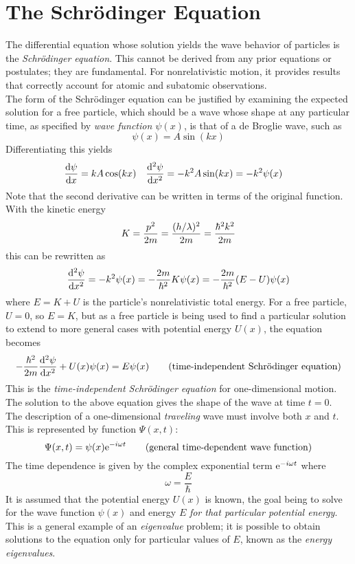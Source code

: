 \documentclass{subfiles}
\begin{document}
	\section{The Schr\"odinger Equation}
		The differential equation whose solution yields the wave behavior of particles is the \textit{Schr\"odinger equation}. This cannot be derived from any prior equations or postulates; they are fundamental. For nonrelativistic motion, it provides results that correctly account for atomic and subatomic observations. \\
		The form of the Schr\"odinger equation can be justified by examining the expected solution for a free particle, which should be a wave whose shape at any particular time, as specified by \textit{wave function \(\psi(x)\)}, is that of a de Broglie wave, such as
			\[\psi(x) = A\sin(kx)\]
			Differentiating this yields
			\begin{align*}
				\dv{\psi}{x} &= kA\cos(kx) &
					\dv[2]{\psi}{x} &= -k^2A\sin(kx)
						= -k^2\psi(x)
			\end{align*}
			Note that the second derivative can be written in terms of the original function. With the kinetic energy
			\[
				K = \frac{p^2}{2m} \\
					= \frac{(h/\lambda)^2}{2m}
					= \frac{\hbar^2k^2}{2m}	
			\]
			this can be rewritten as
			\[
				\dv[2]{\psi}{x}
					= -k^2\psi(x)
					= -\frac{2m}{\hbar^2}K\psi(x)
					= -\frac{2m}{\hbar^2}(E - U)\psi(x)
			\]
			where \(E = K + U\) is the particle's nonrelativistic total energy. For a free particle, \(U = 0\), so \(E = K\), but as a free particle is being used to find a particular solution to extend to more general cases with potential energy \(U(x)\), the equation becomes
			\[-\frac{\hbar^2}{2m}\dv[2]{\psi}{x} + U(x)\psi(x) = E\psi(x) \tag{time-independent Schr\"odinger equation}\]
			This is the \textit{time-independent Schr\"odinger equation} for one-dimensional motion. \\
		The solution to the above equation gives the shape of the wave at time \(t = 0\). The description of a one-dimensional \textit{traveling} wave must involve both \(x\) and \(t\). This is represented by function \(\Psi(x, t)\):
			\[\Psi(x, t) = \psi(x)\text{e}^{-i\omega t} \tag{general time-dependent wave function}\]
			The time dependence is given by the complex exponential term \(\text{e}^{-i\omega t}\) where
			\[\omega = \frac{E}{\hbar}\]
		It is assumed that the potential energy \(U(x)\) is known, the goal being to solve for the wave function \(\psi(x)\) and energy \(E\) \textit{for that particular potential energy}. This is a general example of an \textit{eigenvalue} problem; it is possible to obtain solutions to the equation only for particular values of \(E\), known as the \textit{energy eigenvalues}. \\
\end{document}
